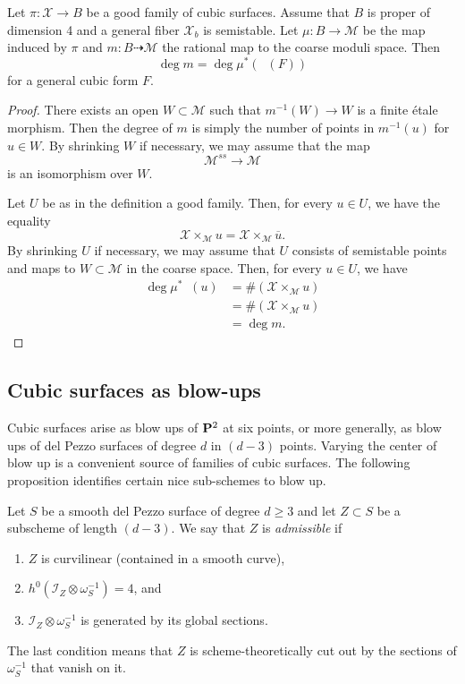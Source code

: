 \documentclass[reqno]{amsart}
\DeclareMathOperator{\Orb}{\overline{Orb}}
\renewcommand{\to}{{\longrightarrow}}
\renewcommand {\P}{{\bf P}}
\numberwithin{equation}{section}
\newcommand{\cX}{\mathcal{X}}
\begin{document}
\begin{proposition}\label{prop:goodisgood}
  Let $\pi \colon \cX \to B$ be a good family of cubic surfaces.
  Assume that $B$ is proper of dimension 4 and a general fiber $\cX_b$ is semistable.
  Let $\mu \colon B \to \mathscr{M}$ be the map induced by $\pi$ and $m \colon B \dashrightarrow \mathcal{M}$ the rational map to the coarse moduli space.
  Then
  \[ \deg m = \deg \mu^*\left( \Orb(F) \right)\]
  for a general cubic form $F$.
\end{proposition}
\begin{proof}
  There exists an open $W \subset \mathcal{M}$ such that $m^{-1} (W) \to W$ is a finite \'etale morphism.
  Then the degree of $m$ is simply the number of points in $m^{-1}(u)$ for $u \in W$.
  By shrinking $W$ if necessary, we may assume that the map
  \[ \mathscr{M}^{ss} \to \mathcal{M}\]
  is an isomorphism over $W$.

  Let $U$ be as in the definition a good family.
  Then, for every $u \in U$, we have the equality
  \[ \cX \times_{\mathscr{M}} u = \cX \times_{\mathscr{M}} \overline u.\]
  By shrinking $U$ if necessary, we may assume that $U$ consists of semistable points and maps to $W \subset \mathcal{M}$ in the coarse space.
  Then, for every $u \in U$, we have
  \begin{align*}
    \deg \mu^* \Orb(u) &= \# \left(\cX \times_{\mathscr{M}} u \right)\\
                       &= \# \left(\cX \times_{\mathcal{M}} u\right) \\
                       &= \deg m.
  \end{align*}
\end{proof}

\subsection{Cubic surfaces as blow-ups}
Cubic surfaces arise as blow ups of $\P^2$ at six points, or more generally, as blow ups of del Pezzo surfaces of degree $d$ in $(d-3)$ points.
Varying the center of blow up is a convenient source of families of cubic surfaces.
The following proposition identifies certain nice sub-schemes to blow up.

\begin{definition}
  \label{def:admissible}
  Let $S$ be a smooth del Pezzo surface of degree $d \geq 3$ and let $Z \subset S$ be a subscheme of length $(d-3)$.
  We say that $Z$ is \emph{admissible} if
  \begin{enumerate}
  \item $Z$ is curvilinear (contained in a smooth curve),
  \item $h^{0}\left(\mathcal{I}_Z \otimes \omega_S^{-1}\right) = 4$, and
  \item $\mathcal{I}_Z \otimes \omega_S^{-1}$ is generated by its global sections.
  \end{enumerate}
\end{definition}
The last condition means that $Z$ is scheme-theoretically cut out by the sections of $\omega_S^{-1}$ that vanish on it.
\end{document}

